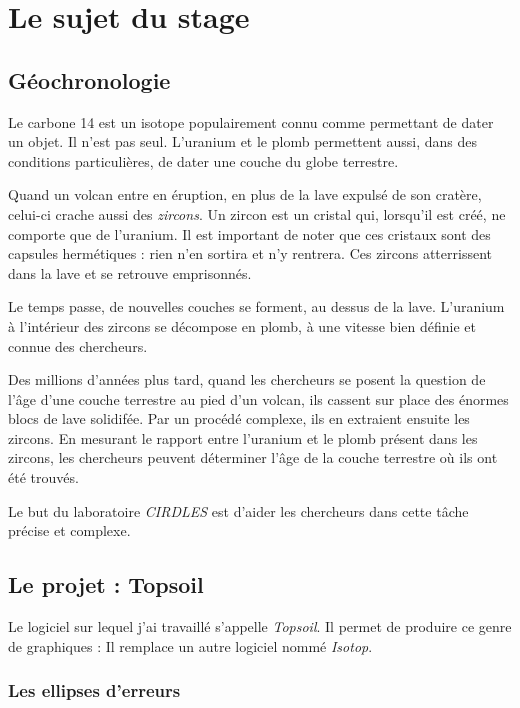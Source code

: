 ﻿\chapter{Le sujet du stage}
\section{Géochronologie} %
Le carbone 14 est un isotope populairement connu comme permettant de dater un objet. Il n'est pas seul. L'uranium et le plomb permettent aussi, dans des conditions particulières, de dater une couche du globe terrestre.

Quand un volcan entre en éruption, en plus de la lave expulsé de son cratère, celui-ci crache aussi des \textit{zircons}. Un zircon est un cristal qui, lorsqu'il est créé, ne comporte que de l'uranium. Il est important de noter que ces cristaux sont des capsules hermétiques : rien n'en sortira et n'y rentrera. Ces zircons atterrissent dans la lave et se retrouve emprisonnés. 

Le temps passe, de nouvelles couches se forment, au dessus de la lave. L'uranium à l'intérieur des zircons se décompose en plomb, à une vitesse bien définie et connue des chercheurs. 

Des millions d'années plus tard, quand les chercheurs se posent la question de l'âge d'une couche terrestre au pied d'un volcan, ils cassent sur place des énormes blocs de lave solidifée. Par un procédé complexe, ils en extraient ensuite les zircons. En mesurant le rapport entre l'uranium et le plomb présent dans les zircons, les chercheurs peuvent déterminer l'âge de la couche terrestre où ils ont été trouvés.

Le but du laboratoire \textit{CIRDLES} est d'aider les chercheurs dans cette tâche précise et complexe.

\section{Le projet : Topsoil}
Le logiciel sur lequel j'ai travaillé s'appelle \textit{Topsoil}. Il permet de produire ce genre de graphiques :
Il remplace un autre logiciel nommé \textit{Isotop}.

\subsection{Les ellipses d'erreurs}

